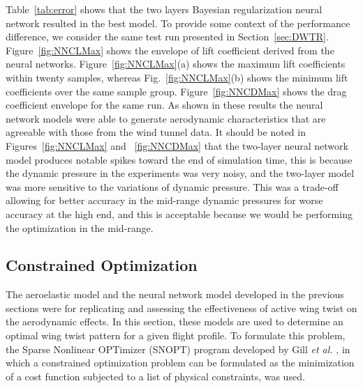 \documentclass[11pt]{ucthesis}
\begin{document}
Table~\ref{tab:error} shows that the two layers Bayesian regularization neural network resulted in the best model. To provide some context of the performance difference, we consider the same test run presented in Section~\ref{sec:DWTR}. Figure~\ref{fig:NNCLMax} shows the envelope of lift coefficient derived from the neural networks. Figure~\ref{fig:NNCLMax}(a) shows the maximum lift coefficients within twenty samples, whereas Fig.~\ref{fig:NNCLMax}(b) shows the minimum lift coefficients over the same sample group. Figure~\ref{fig:NNCDMax} shows the drag coefficient envelope for the same run. As shown in these results the neural network models were able to generate aerodynamic characteristics that are agreeable with those from the wind tunnel data. It should be noted in Figures~\ref{fig:NNCLMax} and ~\ref{fig:NNCDMax} that the two-layer neural network model produces notable spikes toward the end of simulation time, this is because the dynamic pressure in the experiments was very noisy, and the two-layer model was more sensitive to the variations of dynamic pressure. This was a trade-off allowing for better accuracy in the mid-range dynamic pressures for worse accuracy at the high end, and this is acceptable because we would be performing the optimization in the mid-range. 

\subsection{Constrained Optimization}
\label{sec:Copt}
The aeroelastic model and the neural network model developed in the previous sections were for replicating and assessing the effectiveness of active wing twist on the aerodynamic effects. In this section, these models are used to determine an optimal wing twist pattern for a given flight profile. To formulate this problem, the Sparse Nonlinear OPTimizer (SNOPT) program developed by Gill {\it et al.} \cite{gill2005snopt}, in which a constrained optimization problem can be formulated as the minimization of a cost function subjected to a list of physical constraints, was used.     
\end{document}
